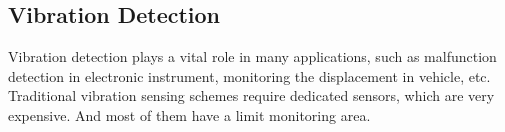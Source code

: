 %
%


%
%
%


\subsection{Vibration Detection}   Vibration detection plays a vital role in many applications, such as malfunction detection in electronic instrument,
monitoring the displacement in vehicle, etc. Traditional vibration sensing schemes require dedicated sensors, which are very expensive. And
most of them have a limit monitoring area.

